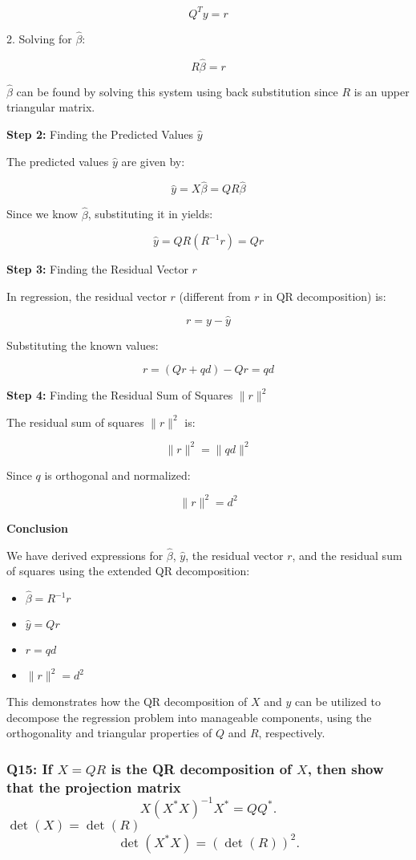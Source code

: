 \documentclass[8pt]{article}
\begin{document}
\[ Q^T y = r \]

2. Solving for \(\hat{\beta}\):

\[ R\hat{\beta} = r \]

\(\hat{\beta}\) can be found by solving this system using back substitution since \( R \) is an upper triangular matrix.

\textbf{Step 2:} Finding the Predicted Values \(\hat{y}\)

The predicted values \(\hat{y}\) are given by:

\[ \hat{y} = X\hat{\beta} = QR\hat{\beta} \]

Since we know \(\hat{\beta}\), substituting it in yields:

\[ \hat{y} = QR(R^{-1}r) = Qr \]

\textbf{Step 3: }Finding the Residual Vector \(r\)

In regression, the residual vector \(r\) (different from \(r\) in QR decomposition) is:

\[ r = y - \hat{y} \]

Substituting the known values:

\[ r = (Qr + qd) - Qr = qd \]

\textbf{Step 4:} Finding the Residual Sum of Squares \(\|r\|^2\)

The residual sum of squares \(\|r\|^2\) is:

\[ \|r\|^2 = \|qd\|^2 \]

Since \( q \) is orthogonal and normalized:

\[ \|r\|^2 = d^2 \]

\textbf{Conclusion}

We have derived expressions for \(\hat{\beta}\), \(\hat{y}\), the residual vector \(r\), and the residual sum of squares using the extended QR decomposition:

\begin{itemize}
    \item \(\hat{\beta} = R^{-1}r\)
    \item \(\hat{y} = Qr\)
    \item \(r = qd\)
    \item \(\|r\|^2 = d^2\)
\end{itemize}

This demonstrates how the QR decomposition of \(X\) and \(y\) can be utilized to decompose the regression problem into manageable components, using the orthogonality and triangular properties of \(Q\) and \(R\), respectively.

\subsubsection*{Q15: If \(X = QR\) is the QR decomposition of \(X\), then show that the projection matrix
\[ X(X^* X)^{-1}X^* = QQ^*. \]
 \(\det(X) = \det(R)\) 
\[ \det(X^* X) = (\det(R))^2. \]}
\end{document}
